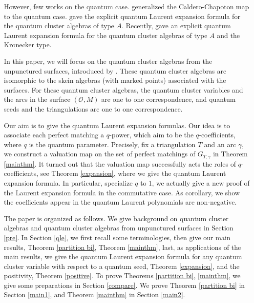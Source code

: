 \documentclass[10pt]{amsart}
\theoremstyle{theorems}
\begin{document}
\medskip

However, few works on the quantum case. \cite{R} generalized the Caldero-Chapoton map to the quantum case. \cite{R1} gave the explicit quantum Laurent expansion formula for the quantum cluster algebras of type $A$. Recently, \cite{CL} gave an explicit quantum Laurent expansion formula for the quantum cluster algebras of type $A$ and the Kronecker type.

\medskip

In this paper, we will focus on the quantum cluster algebras from the unpunctured surfaces, introduced by \cite{M}. These quantum cluster algebras are isomorphic to the skein algebras (with marked points) associated with the surfaces. For these quantum cluster algebras, the quantum cluster variables and the arcs in the surface $(\mathcal O,M)$ are one to one correspondence, and quantum seeds and the triangulations are one to one correspondence.

\medskip

Our aim is to give the quantum Laurent expansion formulas. Our idea is to associate each perfect matching a $q$-power, which aim to be the $q$-coefficients, where $q$ is the quantum parameter. Precisely, fix a triangulation $T$ and an arc $\gamma$, we construct a valuation map on the set of perfect matchings of $G_{T,\gamma}$ in Theorem \ref{mainthm}. It turned out that the valuation map successfully acts the roles of $q$-coefficients, see Theorem \ref{expansion}, where we give the quantum Laurent expansion formula. In particular, specialize $q$ to 1, we actually give a new proof of the Laurent expansion formula in the commutative case. As corollary, we show the coefficients appear in the quantum Laurent polynomials are non-negative.

\medskip

The paper is organized as follows. We give background on quantum cluster algebras and quantum cluster algebras from unpunctured surfaces in Section \ref{pre}. In Section \ref{qle}, we first recall some terminologies, then give our main results, Theorem \ref{partition bi}, Theorem \ref{mainthm}, last, as applications of the main results, we give the quantum Laurent expansion formula for any quantum cluster variable with respect to a quantum seed, Theorem \ref{expansion}, and the positivity, Theorem \ref{positive}. To prove Theorems \ref{partition bi}, \ref{mainthm}, we give some preparations in Section \ref{compare}. We prove Theorem \ref{partition bi} in Section \ref{main1}, and Theorem \ref{mainthm} in Section \ref{main2}.
\end{document}

